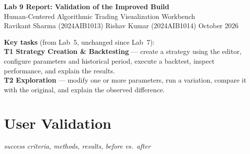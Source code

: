 \documentclass[10pt,a4paper]{article}
\begin{document}
\begin{center}
{\LARGE\bfseries Lab 9 Report: Validation of the Improved Build}\\[4pt]
{\large Human-Centered Algorithmic Trading Visualization Workbench}\\[6pt]
Ravikant Sharma (2024AIB1013) \quad Rishav Kumar (2024AIB1014)  October 2026
\end{center}

\vspace{4pt}

\noindent{}

\vspace{6pt}

\textbf{Key tasks} (from Lab~5, unchanged since Lab~7):\\
\textbf{T1 Strategy Creation \& Backtesting} --- create a strategy using the editor, configure parameters and historical period, execute a backtest, inspect performance, and explain the results.\\
\textbf{T2 Exploration} --- modify one or more parameters, run a variation, compare it with the original, and explain the observed difference.

\section{User Validation}
\hfill\emph{success criteria, methods, results, before vs.\ after}

\end{document}
